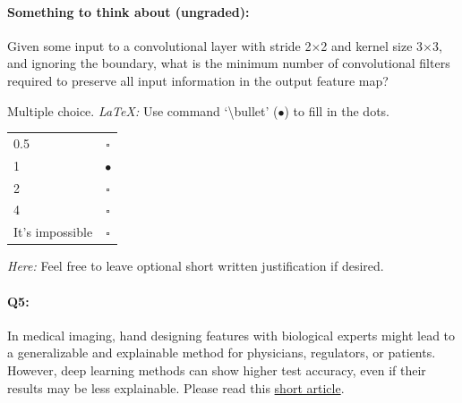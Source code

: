 \paragraph{Something to think about (ungraded):} Given some input to a convolutional layer with stride 2$\times$2 and kernel size 3$\times$3, and ignoring the boundary, what is the minimum number of convolutional filters required to preserve all input information in the output feature map?

Multiple choice.
\emph{LaTeX:} Use command  `\textbackslash bullet' ($\bullet$) to fill in the dots.

\begin{tabular}[h]{lc}
    \toprule
    0.5             & $\square$ \\
    1               & $\bullet$ \\
    2               & $\square$ \\
    4               & $\square$ \\
    It's impossible & $\square$ \\
    \bottomrule
\end{tabular}

\emph{Here:} Feel free to leave optional short written justification if desired.

\pagebreak
\paragraph{Q5:}
In medical imaging, hand designing features with biological experts might lead to a generalizable and explainable method for physicians, regulators, or patients. However, deep learning methods can show higher test accuracy, even if their results may be less explainable.
Please read this \href{https://drive.google.com/file/d/16CztlicOOTImvP9ZrtTUNKwLuv6srOBW/view?usp=sharing}{short article}.

